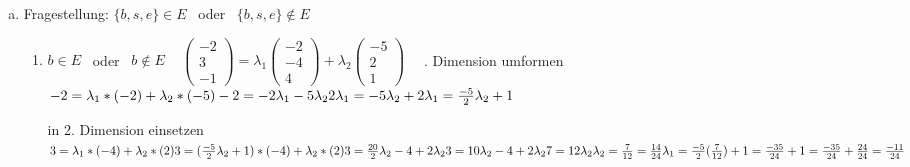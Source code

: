 \documentclass[10pt,ngerman]{scrartcl}
\begin{document}
\begin{enumerate}[1.]
	\begin{enumerate}[(a)]
	\item Fragestellung: \begin{math}\{b, s, e \} \in E\end{math} ~oder~ \begin{math}\{b, s, e \} \notin E \end{math}\newline
	\begin{enumerate}
	\item \begin{math}b \in E\end{math} ~oder~ \begin{math}b \notin E \end{math}\newline
	 ~\newline
	\begin{math}\begin{pmatrix}-2 \\ 3 \\ -1\end{pmatrix} = \lambda _1 \begin{pmatrix}-2 \\ -4 \\ 4\end{pmatrix} + \lambda _2\begin{pmatrix}-5 \\ 2 \\ 1\end{pmatrix} \end{math}\newline
	 ~\newline~. Dimension umformen\newline
	\begin{math}
	-2 = \lambda _1 * (-2) + \lambda _2 * (-5) \newline
	-2 = -2 \lambda _1  - 5 \lambda _2 \newline
	2 \lambda _1 = -5 \lambda _2 + 2 \newline
	\lambda _1 = \frac{-5}{2} \lambda _2 + 1
	\end{math}
	
	in 2. Dimension einsetzen \newline
	\begin{math}
	3 = \lambda _1 * (-4) + \lambda _2 * (2) \newline
	3 = (\frac{-5}{2} \lambda _2 + 1) * (-4) + \lambda _2 * (2) \newline
	3 = \frac{20}{2} \lambda _2 - 4 + 2\lambda _2  \newline
	3 = 10 \lambda _2 - 4 + 2\lambda _2  \newline
	7 = 12 \lambda _2 \newline
	\lambda _2 = \frac{7}{12} = \frac{14}{24} \newline
	\lambda _1 = \frac{-5}{2} (\frac{7}{12}) + 1 = \frac{-35}{24} + 1  = \frac{-35}{24} + \frac{24}{24} = \frac{-11}{24}
	\end{math}
	

\end{enumerate}
\end{enumerate}
\end{enumerate}
\end{document}
